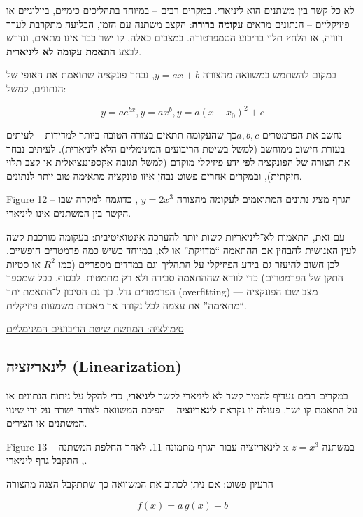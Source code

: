 \documentclass[
  hebrew,
  letterpaper,
  DIV=11,
  numbers=noendperiod]{scrreprt}
\begin{document}
{לא כל קשר בין משתנים הוא ליניארי. במקרים רבים -- במיוחד בתהליכים
כימיים, ביולוגיים או פיזיקליים -- הנתונים מראים \textbf{עקומה ברורה}}:
{הקצב משתנה עם הזמן, הבליעה מתקרבת לערך רוויה, או הלחץ תלוי בריבוע
הטמפרטורה. במצבים כאלה, קו ישר כבר אינו מתאים, ונדרש לבצע \textbf{התאמת
עקומה לא ליניארית}}.

{במקום להשתמש במשוואה מהצורה} \(y = ax + b\), {נבחר פונקציה שתואמת את
האופי של הנתונים, למשל}:

\[y = ae^{bx},y = ax^{b},y = a(x - x_{0})^{2} + c\]

{נחשב את הפרמטרים} \(a,b,c\){כך שהעקומה תתאים בצורה הטובה ביותר למדידות
-- לעיתים בעזרת חישוב ממוחשב (למשל בשיטת הריבועים המינימליים
הלא-ליניארית)}. {לעיתים נבחר את הצורה של הפונקציה לפי ידע פיזיקלי מוקדם
(למשל תגובה אקספוננציאלית או קצב תלוי חזקתית), ובמקרים אחרים פשוט נבחן
איזו פונקציה מתאימה טוב יותר לנתונים}.

Figure 12 -- {הגרף מציג נתונים המתואמים לעקומה מהצורה} {\(y = 2x^{3}\)}
{, כדוגמה למקרה שבו הקשר בין המשתנים אינו ליניארי.}

עם זאת, התאמות לא־ליניאריות קשות יותר להערכה אינטואיטיבית: בעקומה מורכבת
קשה לעין האנושית להבחין אם ההתאמה ``מדויקת'' או לא, במיוחד כשיש כמה
פרמטרים חופשיים. לכן חשוב להיעזר גם בידע הפיזיקלי על התהליך וגם במדדים
מספריים (כמו \(R^{2}\) או סטיות התקן של הפרמטרים) כדי לוודא שההתאמה
סבירה ולא רק מתמטית. לבסוף, ככל שמספר הפרמטרים גדל, כך גם הסיכון ל־התאמת
יתר (overfitting) --- מצב שבו הפונקציה ``מתאימה'' את עצמה לכל נקודה אך
מאבדת משמעות פיזיקלית.

\href{simulations/leastsquares.html}{סימולציה: המחשת שיטת הריבועים
המינימליים}

\subsection{\texorpdfstring{\textbf{{לינאריזציה}}
(Linearization)}{לינאריזציה (Linearization)}}\label{ux5dcux5d9ux5e0ux5d0ux5e8ux5d9ux5d6ux5e6ux5d9ux5d4-linearization}

{במקרים רבים נעדיף להמיר קשר לא ליניארי לקשר \textbf{ליניארי}}, {כדי
להקל על ניתוח הנתונים או על התאמת קו ישר. פעולה זו נקראת
\textbf{לינאריזציה}} -- {הפיכת המשוואה לצורה ישרה על-ידי שינוי המשתנים
או הצירים}.

Figure 13 -- {לינאריזציה עבור הגרף מתמונה 11. לאחר החלפת המשתנה} {x}
{במשתנה} {\(z = x^{3}\)} {, התקבל גרף ליניארי.}

הרעיון פשוט: אם ניתן לכתוב את המשוואה כך שתתקבל הצגה מהצורה

\[
f(x) = a\,g(x) + b
\]
\end{document}
